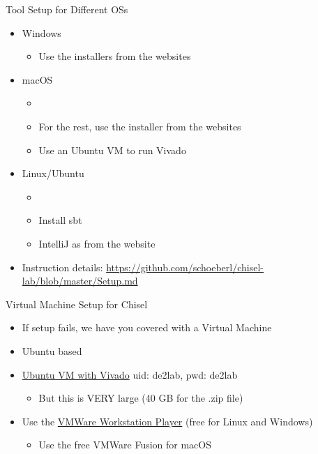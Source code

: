 \begin{frame}[fragile]{Tool Setup for Different OSs}
\begin{itemize}
\item Windows
\begin{itemize}
\item Use the installers from the websites
\end{itemize}
\item macOS
\begin{itemize}
\item {}
\item For the rest, use the installer from the websites
\item Use an Ubuntu VM to run Vivado
\end{itemize}
\item Linux/Ubuntu
\begin{itemize}
\item {}
\item Install sbt
\item IntelliJ as from the website
\end{itemize}
\item Instruction details: \url{https://github.com/schoeberl/chisel-lab/blob/master/Setup.md}
\end{itemize}
\end{frame}

\begin{frame}[fragile]{Virtual Machine Setup for Chisel}
\begin{itemize}
\item If setup fails, we have you covered with a Virtual Machine
\item Ubuntu based
\item \href{https://patmos-download.compute.dtu.dk/de2lab.zip}{Ubuntu VM with Vivado} uid: de2lab, pwd: de2lab
\begin{itemize}
\item But this is VERY large (40 GB for the .zip file)
\end{itemize}
\item Use the  \href{https://www.vmware.com/products/workstation-player.html} {VMWare Workstation Player} (free for Linux and Windows)
\begin{itemize}
\item Use the free VMWare Fusion for macOS
\end{itemize}
\end{itemize}
\end{frame}

